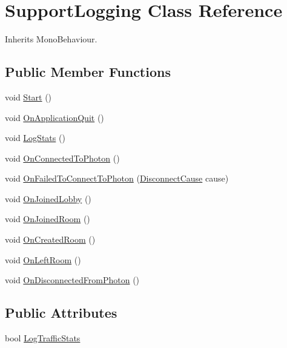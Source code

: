 \hypertarget{class_support_logging}{}\section{Support\+Logging Class Reference}
\label{class_support_logging}


Inherits Mono\+Behaviour.

\subsection*{Public Member Functions}
\begin{DoxyCompactItemize}
\item 
void \hyperlink{class_support_logging_a8325891b30735e37ee21149ab01fc728}{Start} ()
\item 
void \hyperlink{class_support_logging_ad3ba63b59fde5fae3ec3ae4757ab86ef}{On\+Application\+Quit} ()
\item 
void \hyperlink{class_support_logging_a2cf1e7f4fdfb3329552d5506598046fe}{Log\+Stats} ()
\item 
void \hyperlink{class_support_logging_a2fd44e6b53c8ae0bf3742a534fb1136a}{On\+Connected\+To\+Photon} ()
\item 
void \hyperlink{class_support_logging_a49bad1d64e88101d025b2df390a69c09}{On\+Failed\+To\+Connect\+To\+Photon} (\hyperlink{group__public_api_gad61b1461cf60ad9e8d86923d111d5cc9}{Disconnect\+Cause} cause)
\item 
void \hyperlink{class_support_logging_afd95b3b1a9408719cddbf961997ed25c}{On\+Joined\+Lobby} ()
\item 
void \hyperlink{class_support_logging_a32ed60880380b9e3daca71cc166c179c}{On\+Joined\+Room} ()
\item 
void \hyperlink{class_support_logging_a4ab7ea38ffc9ab875bcd9376474b4179}{On\+Created\+Room} ()
\item 
void \hyperlink{class_support_logging_a5bd93b68fab7fe19d7fee58241f20676}{On\+Left\+Room} ()
\item 
void \hyperlink{class_support_logging_a87ce7d6e2c42e9d1d61df4173decbe13}{On\+Disconnected\+From\+Photon} ()
\end{DoxyCompactItemize}
\subsection*{Public Attributes}
\begin{DoxyCompactItemize}
\item 
bool \hyperlink{class_support_logging_a494d8a15f8657d606dd4c1dfbf0b9042}{Log\+Traffic\+Stats}
\end{DoxyCompactItemize}
